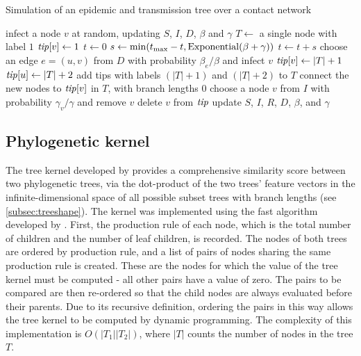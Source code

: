 \begin{algorithm}
  \label{alg:nettree}
  \caption{Simulation of an epidemic and transmission tree over a contact network}
  \begin{algorithmic}
    \State infect a node $v$ at random, updating $S$, $I$, $D$, $\beta$ and $\gamma$
    \State $T \gets$ a single node with label $1$
    \State $\mathit{tip}[v] \gets 1$
    \State $t \gets 0$
      \State $s \gets \min(t_{\max} - t, \operatorname{Exponential}(\beta + \gamma))$
      \EndFor
      \State $t \gets t + s$
          \State choose an edge $e = (u, v)$ from $D$ with probability $\beta_e / \beta$
                 and infect $v$
          \State $\mathit{tip}[v] \gets |T|+1$
          \State $\mathit{tip}[u] \gets |T|+2$
          \State add tips with labels $(|T|+1)$ and $(|T|+2)$ to $T$
          \State connect the new nodes to $\mathit{tip}[v]$ in $T$, with branch lengths $0$
        \Else
          \State choose a node $v$ from $I$ with probability $\gamma_v / \gamma$
                 and remove $v$
          \State delete $v$ from $\mathit{tip}$
        \EndIf
        \State update $S$, $I$, $R$, $D$, $\beta$, and $\gamma$
      \EndIf
    \EndWhile
  \end{algorithmic}
\end{algorithm}

\subsection{Phylogenetic kernel}

The tree kernel developed by \textcite{poon2013mapping} provides a
comprehensive similarity score between two phylogenetic trees, via the
dot-product of the two trees' feature vectors in the infinite-dimensional space
of all possible subset trees with branch lengths (see \cref{subsec:treeshape}).
The kernel was implemented using the fast algorithm developed by
\textcite{moschitti2006making}. First, the production rule of each node, which
is the total number of children and the number of leaf children, is recorded.
The nodes of both trees are ordered by production rule, and a list of pairs of
nodes sharing the same production rule is created. These are the nodes for
which the value of the tree kernel must be computed - all other pairs have a
value of zero. The pairs to be compared are then re-ordered so that the child
nodes are always evaluated before their parents. Due to its recursive
definition, ordering the pairs in this way allows the tree kernel to be
computed by dynamic programming. The complexity of this implementation is
$O(|T_1||T_2|)$, where $|T|$ counts the number of nodes in the tree $T$.

